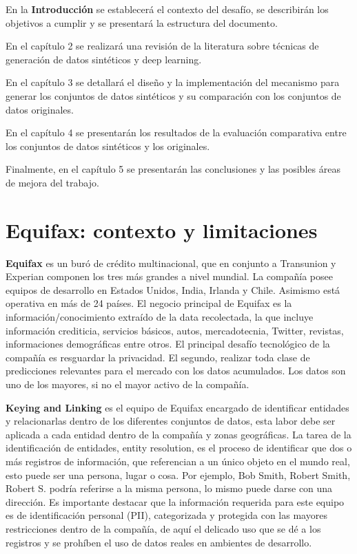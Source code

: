 En la \textbf{Introducción} se establecerá el contexto del desafío, se describirán los objetivos a cumplir y se presentará la estructura del documento.

En el capítulo 2 se realizará una revisión de la literatura sobre técnicas de generación de datos sintéticos y deep learning.

En el capítulo 3 se detallará el diseño y la implementación del mecanismo para generar los conjuntos de datos sintéticos y su comparación con los conjuntos de datos originales.

En el capítulo 4 se presentarán los resultados de la evaluación comparativa entre los conjuntos de datos sintéticos y los originales.

Finalmente, en el capítulo 5 se presentarán las conclusiones y las posibles áreas de mejora del trabajo.

\newpage
\section{Equifax: contexto y limitaciones}

\textbf{Equifax} es un buró de crédito multinacional, que en conjunto a Transunion y Experian componen los tres más grandes a nivel mundial. La compañía posee equipos de desarrollo en Estados Unidos, India, Irlanda y Chile. Asimismo está operativa en más de 24 países. El negocio principal de Equifax es la información/conocimiento extraído de la data recolectada, la que incluye información crediticia, servicios básicos, autos, mercadotecnia, Twitter, revistas, informaciones demográficas entre otros. El principal desafío tecnológico de la compañía es resguardar la privacidad. El segundo, realizar toda clase de predicciones relevantes para el mercado con los datos acumulados. Los datos son uno de los mayores, si no el mayor activo de la compañía.

\textbf{Keying and Linking} es el equipo de Equifax encargado de identificar entidades y relacionarlas dentro de los diferentes conjuntos de datos, esta labor debe ser aplicada a cada entidad dentro de la compañía y zonas geográficas. La tarea de la identificación de entidades, entity resolution, es el proceso de identificar que dos o más registros de información, que referencian a un único objeto en el mundo real, esto puede ser una persona, lugar o cosa. Por ejemplo, Bob Smith, Robert Smith, Robert S. podría referirse a la misma persona, lo mismo puede darse con una dirección. Es importante destacar que la información requerida para este equipo es de identificación personal (PII), categorizada y protegida con las mayores restricciones dentro de la compañía, de aquí el delicado uso que se dé a los registros y se prohíben el uso de datos reales en ambientes de desarrollo. 

